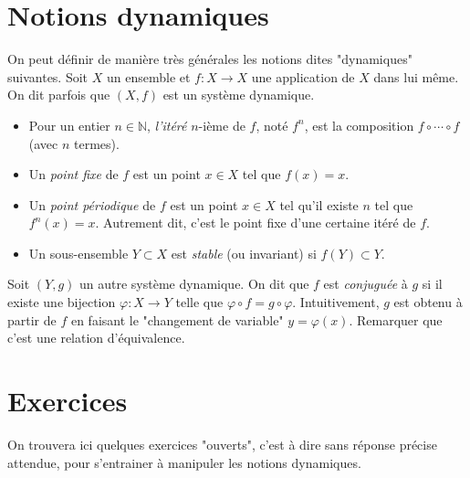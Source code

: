 \documentclass{article}
\begin{document}
\newcommand\C{\mathbb{C}}
\newcommand\R{\mathbb{R}}
\newcommand\N{\mathbb{N}}
\newcommand\D{\mathbb{D}}
\newcommand\Z{\mathbb{Z}}

\section{Notions dynamiques}
\label{sec:notions_dynamiques}

On peut définir de manière très générales les notions
dites "dynamiques" suivantes.
Soit $ X $ un ensemble
et $ f : X \to X $
une application de $ X $ dans lui même.
On dit parfois que
$ (X,f) $
est un système dynamique.

\begin{itemize}
        \item
      	  Pour un entier $ n \in \mathbb{N} $,
      	  \emph{l'itéré} $n$-ième de $ f $,
      	  noté $ f^{n} $,
      	  est la composition
      	  $ f \circ \cdots \circ f $
      	  (avec $ n $ termes).

        \item Un \emph{point fixe}
      	  de $ f $ 
      	  est un point $ x \in X $
      	  tel que $ f(x) = x $.
        \item Un
      	  \emph{point périodique}
      	  de $ f $
      	  est un point $ x \in X $
      	  tel qu'il existe $ n $
      	  tel que $ f^n(x) = x $.
      	  Autrement dit,
      	  c'est le point fixe
      	  d'une certaine itéré
      	  de $ f $.
        \item Un sous-ensemble
      	  $ Y \subset X $
      	  est \emph{stable}
      	  (ou invariant)
      	  si $ f(Y) \subset Y $.
\end{itemize}

Soit
$ (Y,g) $
un autre système dynamique.
On dit que
$ f $ est
\emph{conjuguée}
à
$ g $
si il existe
une bijection
$ \varphi : X \to Y $
telle que
$ \varphi \circ f = g \circ \varphi $.
Intuitivement,
$ g $ est obtenu à partir de $ f $
en faisant le "changement de variable"
$ y = \varphi(x) $.
Remarquer que c'est une relation d'équivalence.

\section{Exercices}
\label{sec:exercices}

On trouvera ici quelques exercices
"ouverts", c'est à dire sans réponse précise attendue,
pour s'entrainer à manipuler les notions dynamiques.
\end{document}
